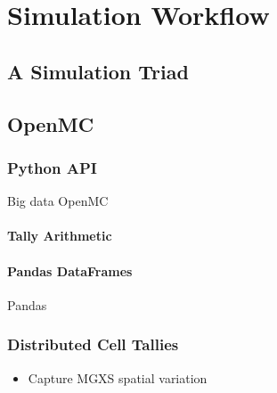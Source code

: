 \chapter{Simulation Workflow}
\label{chap:workflow}

\section{A Simulation Triad}
\label{chap3:triad}


\section{OpenMC}
\label{sec:chap3-openmc}

\subsection{Python API}
\label{sec:chap3-py-api}

Big data OpenMC~\cite{boyd2016bigdata}

\subsubsection{Tally Arithmetic}
\label{sec:chap3-tally-arithmetic}

\subsubsection{Pandas DataFrames}
\label{sec:chap3-pandas-df}

Pandas~\cite{mckinney2010pandas}

\subsection{Distributed Cell Tallies}
\label{sec:chap3-distribcells}

\begin{itemize}
  \item Capture \ac{MGXS} spatial variation~\cite{lax2014distribcell}
\end{itemize}

